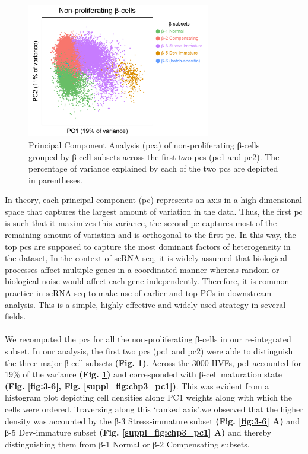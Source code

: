 \begin{figure}
\includegraphics[width=8cm]{Chapter5/Fig/F3-6-01.png}
\caption[PCA of Non-proliferating β-cell subsets]{Principal Component Analysis (\gls{pca}) of non-proliferating β-cells grouped by β-cell subsets across the first two \glspl{pc} (\gls{pc}1 and \gls{pc}2). The percentage of variance explained by each of the two \glspl{pc} are depicted in parentheses.}
\label{fig:3-5}
\end{figure}


In theory, each principal component (\gls{pc}) represents an axis in a high-dimensional space that captures the largest amount of variation in the data. Thus, the first \gls{pc} is such that it maximizes this variance, the second \gls{pc} captures most of the remaining amount of variation and is orthogonal to the first \gls{pc}. In this way, the top \glspl{pc} are supposed to capture the most dominant factors of heterogeneity in the dataset, In the context of scRNA-seq, it is widely assumed that biological processes affect multiple genes in a coordinated manner whereas random or biological noise would affect each gene independently. %
Therefore, it is common practice in scRNA-seq to make use of earlier and top PCs in downstream analysis. This is a simple, highly-effective and widely used strategy in several fields.\\\\

We recomputed the \glspl{pc} for all the non-proliferating β-cells in our re-integrated subset. In our analysis, the first two \glspl{pc} (\gls{pc}1 and \gls{pc}2) were able to distinguish the three major β-cell subsets \textbf{(Fig. \ref{fig:3-5})}. Across the 3000 HVFs, \gls{pc}1 accounted for 19\% of the variance \textbf{(Fig. \ref{fig:3-5})} and corresponded with β-cell maturation state \textbf{(Fig. \ref{fig:3-6}, Fig. \ref{suppl_fig:chp3_pc1})}. This was evident from a histogram plot depicting cell densities along PC1 weights along with which the cells were ordered. Traversing along this `ranked axis’,we observed  that the higher density was accounted by the β-3 Stress-immature subset \textbf{(Fig. \ref{fig:3-6} A)} and β-5 Dev-immature subset \textbf{(Fig. \ref{suppl_fig:chp3_pc1} A)} and thereby distinguishing them from β-1 Normal or β-2 Compensating subsets.


